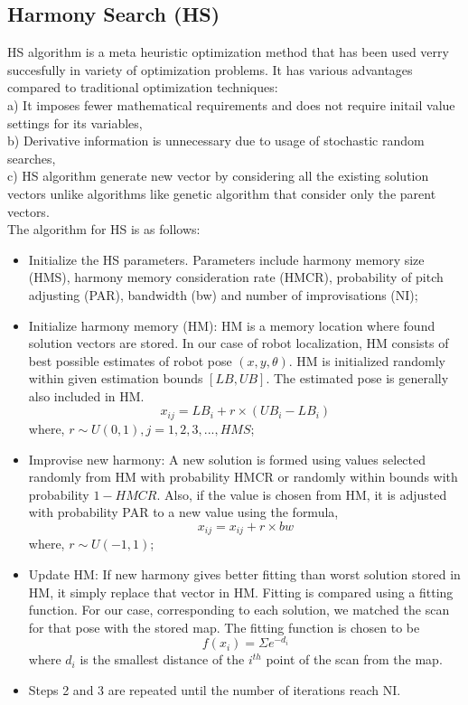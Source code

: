 \documentclass[letterpaper, 10 pt, conference]{ieeeconf}  %
\begin{document}
\subsection{Harmony Search (HS)}
HS algorithm is a meta heuristic optimization method that has been used verry succesfully in variety of optimization problems. It has various advantages compared to traditional optimization techniques:
\\a) It imposes fewer mathematical requirements and does not require initail value settings for its variables,
\\b) Derivative  information is unnecessary due to usage of stochastic random searches,
\\c) HS algorithm generate new vector by considering all the existing solution vectors unlike algorithms like genetic algorithm that consider only the parent vectors.\vspace*{1mm}\\
The algorithm for HS is as follows:
\begin{itemize}
 \item Initialize the HS parameters. Parameters include harmony memory size (HMS), harmony memory consideration rate (HMCR), probability of pitch adjusting (PAR), bandwidth (bw) and number of improvisations (NI);
\item Initialize harmony memory (HM): HM is a memory location where found solution vectors are stored. In our case of robot localization, HM consists of best possible estimates of robot pose $(x,y,\theta)$. HM is initialized randomly within given estimation bounds $[LB, UB]$. The estimated pose is generally also included in HM. \[ x_{ij} = LB_i + r \times (UB_i - LB_i)\] where, $ r\sim U(0,1), j = 1,2,3, ..., HMS$;
\item Improvise new harmony: A new solution is formed using values selected randomly from HM with probability HMCR or randomly within bounds with probability $1-HMCR$. Also, if the value is chosen from HM, it is adjusted with probability PAR to a new value using the formula, \[ x_{ij} = x_{ij}+ r\times bw\] where, $r\sim U(-1,1)$;
\item Update HM: If new harmony gives better fitting than worst solution stored in HM, it simply replace that vector in HM. Fitting is compared using a fitting function. For our case, corresponding to each solution, we matched the scan for that pose with the stored map. The fitting function is chosen to be \[ f(x_i) = \Sigma{e^{-d_i}} \] where $d_i$ is the smallest distance of the $i^{th}$ point of the scan from the map.
\item Steps 2 and 3 are repeated until the number of iterations reach NI.
\end{itemize}
\end{document}
